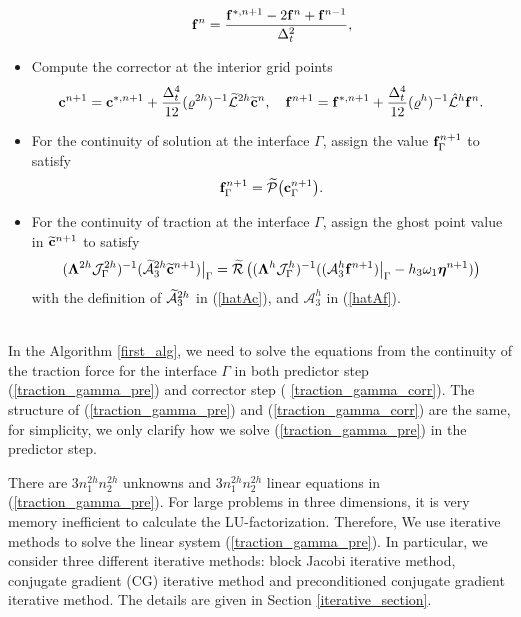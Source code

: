 \begin{breakablealgorithm}
\begin{itemize}
{\begin{equation*}
			{\bf f}^{n} = \frac{{\bf f}^{*,n+1}-2{\bf f}^{n}+{\bf f}^{n-1}}{\Delta^2_t},
			\end{equation*}
		}
		\item{Compute the corrector at the interior grid points
			\begin{equation*}
			{\bf c}^{n+1} = {\bf c}^{*,n+1} + \frac{\Delta_t^4}{12}(\varrho^{2h})^{-1}\wt{\mathcal{L}}^{2h}\wt{\bf{c}}^{n},\ \ \ 
			{\bf f}^{n+1} = {\bf f}^{*,n+1} + \frac{\Delta_t^4}{12}(\varrho^{h})^{-1}\hat{\mathcal{L}}^{h}{\bf{f}}^{n}.
			\end{equation*}
		}
		\item{For the continuity of solution at the interface $\Gamma$, assign the value ${\bf f}^{n+1}_\Gamma$ to satisfy
			\begin{equation*}
			{\bf f}^{n+1}_{\Gamma} = \widetilde{\mathcal{P}}\big({\bf c}^{n+1}_{\Gamma}\big).
			\end{equation*}
		}
		\item{For the continuity of traction at the interface $\Gamma$, assign the ghost point value in $\widetilde{\bf c}^{n+1}$ to satisfy
			\begin{equation}\label{traction_gamma_corr}
			(\bm{\Lambda}^{2h}{\mathcal J}_{\Gamma}^{2h})^{-1}(\wt{\mathcal{A}}_3^{2h}\wt{\bf c}^{n+1})\big|_\Gamma
			= \wt{\mathcal{R}}\left((\bm{\Lambda}^{h}{\mathcal J}^h_{\Gamma})^{-1}((\mathcal{A}_3^h{\bf f}^{n+1})\big|_\Gamma-h_3\omega_1{\bm \eta}^{n+1})\right)
			\end{equation}
			with the definition of $\widetilde{\mathcal{A}}_3^{2h}$ in (\ref{hatAc}), and $\mathcal{A}_3^h$ in (\ref{hatAf}).
		}
	\end{itemize}
\end{breakablealgorithm}
~\\

In the Algorithm \ref{first_alg}, we need to solve the equations from the continuity of the traction force for the interface $\Gamma$ in both predictor step (\ref{traction_gamma_pre}) and corrector step (
\ref{traction_gamma_corr}). The structure of (\ref{traction_gamma_pre}) and (\ref{traction_gamma_corr}) are the same, for simplicity, we only clarify how we solve (\ref{traction_gamma_pre}) in the predictor step.

There are $3n_1^{2h}n_2^{2h}$ unknowns and $3n_1^{2h}n_2^{2h}$ linear equations in (\ref{traction_gamma_pre}). For large problems in three dimensions, it is very memory inefficient to calculate the LU-factorization. Therefore, We use iterative methods to solve the linear system (\ref{traction_gamma_pre}). In particular, we consider three different iterative methods: block Jacobi iterative method, conjugate gradient (CG) iterative method and preconditioned conjugate gradient iterative method. The details are given in Section \ref{iterative_section}.